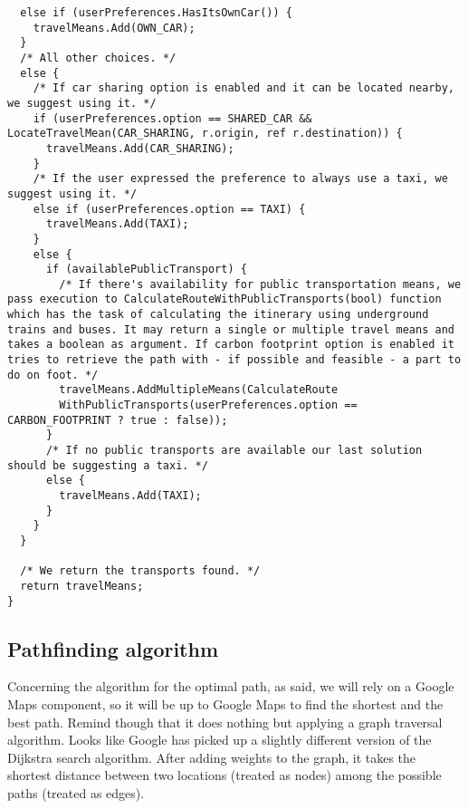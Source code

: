 \begin{tcolorbox}
\begin{verbatim}
  else if (userPreferences.HasItsOwnCar()) {
    travelMeans.Add(OWN_CAR);
  }
  /* All other choices. */
  else {
    /* If car sharing option is enabled and it can be located nearby, we suggest using it. */
    if (userPreferences.option == SHARED_CAR && LocateTravelMean(CAR_SHARING, r.origin, ref r.destination)) {
      travelMeans.Add(CAR_SHARING);
    }
    /* If the user expressed the preference to always use a taxi, we suggest using it. */
    else if (userPreferences.option == TAXI) {
      travelMeans.Add(TAXI);    
    }
    else {
      if (availablePublicTransport) {
        /* If there's availability for public transportation means, we pass execution to CalculateRouteWithPublicTransports(bool) function which has the task of calculating the itinerary using underground trains and buses. It may return a single or multiple travel means and takes a boolean as argument. If carbon footprint option is enabled it tries to retrieve the path with - if possible and feasible - a part to do on foot. */
        travelMeans.AddMultipleMeans(CalculateRoute
        WithPublicTransports(userPreferences.option == CARBON_FOOTPRINT ? true : false));
      }
      /* If no public transports are available our last solution should be suggesting a taxi. */
      else {
        travelMeans.Add(TAXI);
      }
    }
  }

  /* We return the transports found. */
  return travelMeans;
}

\end{verbatim}
\end{tcolorbox}
\subsection*{Pathfinding algorithm}
Concerning the algorithm for the optimal path, as said, we will rely on a Google Maps component, so it will be up to Google Maps to find the shortest and the best path. Remind though that it does nothing but applying a graph traversal algorithm. Looks like Google has picked up a slightly different version of the Dijkstra search algorithm\cite{maps}. After adding weights to the graph, it takes the shortest distance between two locations (treated as nodes) among the possible paths (treated as edges).
